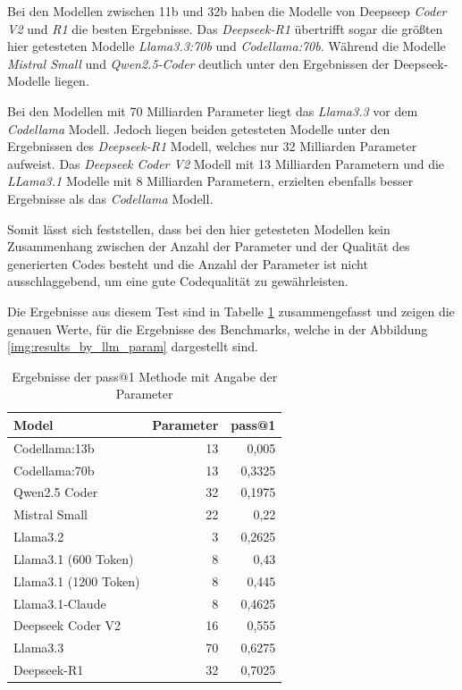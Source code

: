 Bei den Modellen zwischen 11b und 32b haben die Modelle von Deepseep \textit{Coder V2} und \textit{R1} die besten Ergebnisse. Das \textit{Deepseek-R1} übertrifft sogar die größten hier getesteten Modelle \textit{Llama3.3:70b} und \textit{Codellama:70b}. Während die Modelle \textit{Mistral Small} und \textit{Qwen2.5-Coder} deutlich unter den Ergebnissen der Deepseek-Modelle liegen.\vspace{0.2cm}

Bei den Modellen mit 70 Milliarden Parameter liegt das \textit{Llama3.3} vor dem \textit{Codellama} Modell. Jedoch liegen beiden getesteten Modelle unter den Ergebnissen des \textit{Deepseek-R1} Modell, welches nur 32 Milliarden Parameter aufweist. Das \textit{Deepseek Coder V2} Modell mit 13 Milliarden Parametern und die \textit{LLama3.1} Modelle mit 8 Milliarden Parametern, erzielten ebenfalls besser Ergebnisse als das \textit{Codellama} Modell.\vspace{0.2cm}

Somit lässt sich feststellen, dass bei den hier getesteten Modellen kein Zusammenhang zwischen der Anzahl der Parameter und der Qualität des generierten Codes besteht und die Anzahl der Parameter ist nicht ausschlaggebend, um eine gute Codequalität zu gewährleisten.\vspace{0.2cm}

Die Ergebnisse aus diesem Test sind in Tabelle \ref{tab:prompt_results_open_models_by_param} zusammengefasst und zeigen die genauen Werte, für die Ergebnisse des Benchmarks, welche in der Abbildung \ref{img:results_by_llm_param} dargestellt sind.

\begin{table}[!ht]
	\begin{tabular}{|l|r|r|}
		\hline
		\textbf{Model} & \textbf{Parameter} & \textbf{pass@1} \\
		\hline
		Codellama:13b         & 13 &  0,005 \\
		Codellama:70b         & 13 & 0,3325 \\
		Qwen2.5 Coder         & 32 & 0,1975 \\
		Mistral Small         & 22 &   0,22 \\
		Llama3.2              &  3 & 0,2625 \\
		Llama3.1 (600 Token)  &  8 &   0,43 \\
		Llama3.1 (1200 Token) &  8 &  0,445 \\
		Llama3.1-Claude       &  8 & 0,4625 \\
		Deepseek Coder V2     & 16 &  0,555 \\
		Llama3.3              & 70 & 0,6275 \\
		Deepseek-R1           & 32 & 0,7025 \\
		\hline
		\hline
	\end{tabular}
	\centering
	\label{tab:prompt_results_open_models_by_param}
	\caption{Ergebnisse der pass@1 Methode mit Angabe der Parameter}
\end{table}


